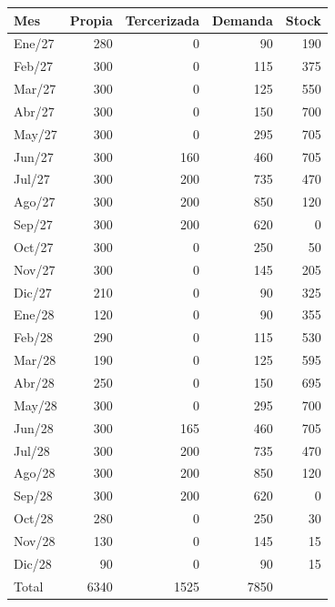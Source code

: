 \begin{tabular}{lr r r r}
\toprule
Mes & Propia & Tercerizada & Demanda & Stock \\
\midrule
Ene/27 & 280 & 0 & 90 & 190 \\
Feb/27 & 300 & 0 & 115 & 375 \\
Mar/27 & 300 & 0 & 125 & 550 \\
Abr/27 & 300 & 0 & 150 & 700 \\
May/27 & 300 & 0 & 295 & 705 \\
Jun/27 & 300 & 160 & 460 & 705 \\
Jul/27 & 300 & 200 & 735 & 470 \\
Ago/27 & 300 & 200 & 850 & 120 \\
Sep/27 & 300 & 200 & 620 & 0 \\
Oct/27 & 300 & 0 & 250 & 50 \\
Nov/27 & 300 & 0 & 145 & 205 \\
Dic/27 & 210 & 0 & 90 & 325 \\
Ene/28 & 120 & 0 & 90 & 355 \\
Feb/28 & 290 & 0 & 115 & 530 \\
Mar/28 & 190 & 0 & 125 & 595 \\
Abr/28 & 250 & 0 & 150 & 695 \\
May/28 & 300 & 0 & 295 & 700 \\
Jun/28 & 300 & 165 & 460 & 705 \\
Jul/28 & 300 & 200 & 735 & 470 \\
Ago/28 & 300 & 200 & 850 & 120 \\
Sep/28 & 300 & 200 & 620 & 0 \\
Oct/28 & 280 & 0 & 250 & 30 \\
Nov/28 & 130 & 0 & 145 & 15 \\
Dic/28 & 90 & 0 & 90 & 15 \\
\midrule
Total & 6340 & 1525 & 7850 &  \\
\bottomrule
\end{tabular}
